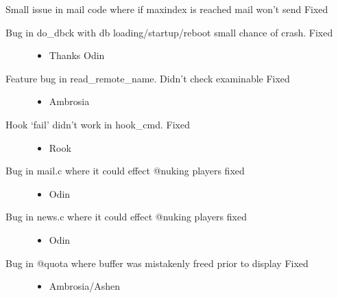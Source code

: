\documentclass[letterpaper,10pt,english]{sphinxmanual}
\begin{document}
\sphinxAtStartPar
Small issue in mail code where if max\sphinxhyphen{}index is reached mail won’t send \sphinxhyphen{} Fixed
\begin{description}
\item[{Bug in do\_dbck with db loading/startup/reboot \sphinxhyphen{} small chance of crash. \sphinxhyphen{}Fixed}] \leavevmode\begin{itemize}
\item {} 
\sphinxAtStartPar
Thanks Odin

\end{itemize}

\item[{Feature bug in read\_remote\_name.  Didn’t check examinable \sphinxhyphen{} Fixed}] \leavevmode\begin{itemize}
\item {} 
\sphinxAtStartPar
Ambrosia

\end{itemize}

\item[{Hook ‘fail’ didn’t work in hook\_cmd.  \sphinxhyphen{} Fixed}] \leavevmode\begin{itemize}
\item {} 
\sphinxAtStartPar
Rook

\end{itemize}

\item[{Bug in mail.c where it could effect @nuking players \sphinxhyphen{} fixed}] \leavevmode\begin{itemize}
\item {} 
\sphinxAtStartPar
Odin

\end{itemize}

\item[{Bug in news.c where it could effect @nuking players \sphinxhyphen{} fixed}] \leavevmode\begin{itemize}
\item {} 
\sphinxAtStartPar
Odin

\end{itemize}

\item[{Bug in @quota where buffer was mistakenly freed prior to display \sphinxhyphen{} Fixed}] \leavevmode\begin{itemize}
\item {} 
\sphinxAtStartPar
Ambrosia/Ashen

\end{itemize}


\end{description}
\end{document}
